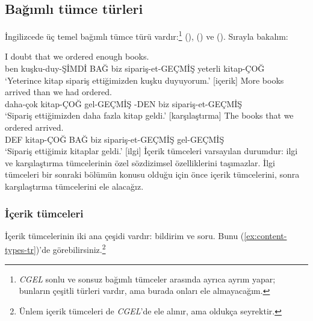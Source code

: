 \subsection{Bağımlı tümce türleri}

İngilizcede üç temel bağımlı tümce türü vardır:\footnote{\textit{CGEL} sonlu ve sonsuz bağımlı tümceler arasında ayrıca ayrım yapar; bunların çeşitli türleri vardır, ama burada onları ele almayacağım.}  (),  () ve  (). Sırayla bakalım:

\ea \label{ex:sub-types-tr}
    \ea \gll I doubt that we ordered enough books.\\
        ben kuşku-duy-ŞİMDİ BAĞ biz sipariş-et-GEÇMİŞ yeterli kitap-ÇOĞ\\
    \glt `Yeterince kitap sipariş ettiğimizden kuşku duyuyorum.' [içerik]
    \ex \gll More books arrived than we had ordered.\\
        daha-çok kitap-ÇOĞ gel-GEÇMİŞ -DEN biz sipariş-et-GEÇMİŞ\\
    \glt `Sipariş ettiğimizden daha fazla kitap geldi.' [karşılaştırma]
    \ex \gll The books that we ordered arrived.\\
        DEF kitap-ÇOĞ BAĞ biz sipariş-et-GEÇMİŞ gel-GEÇMİŞ\\
    \glt `Sipariş ettiğimiz kitaplar geldi.' [ilgi]
    \z
\z
İçerik tümceleri varsayılan durumdur: ilgi ve karşılaştırma tümcelerinin özel sözdizimsel özelliklerini taşımazlar. İlgi tümceleri bir sonraki bölümün konusu olduğu için önce içerik tümcelerini, sonra karşılaştırma tümcelerini ele alacağız.

\subsubsection{İçerik tümceleri}

İçerik tümcelerinin iki ana çeşidi vardır: bildirim ve soru. Bunu (\ref{ex:content-types-tr})'de görebilirsiniz.\footnote{Ünlem içerik tümceleri de \textit{CGEL}'de ele alınır, ama oldukça seyrektir.}

